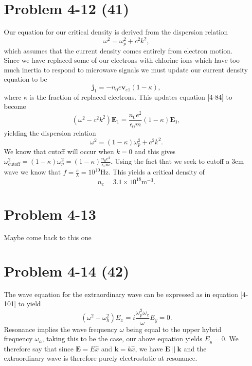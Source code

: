 \section*{Problem 4-12 (41)}
\label{sec:4-12}
Our equation for our critical density is derived from the dispersion relation
\begin{equation*}
	\omega^2 = \omega_p^2 + c^2k^2,
\end{equation*}
which assumes that the current density comes entirely from electron motion. Since we have replaced some of our electrons with chlorine ions which have too much inertia to respond to microwave signals we must update our current density equation to be
\begin{equation*}
	\bm{j}_1 = -n_0e\bm{v}_{e1}(1-\kappa),
\end{equation*}
where \(\kappa \) is the fraction of replaced electrons. This updates equation [4-84] to become 
\begin{equation*}
	\left(\omega^2 - c^2k^2 \right)\bm{E}_1 = \dfrac{n_0e^2}{\epsilon_0m}\left(1-\kappa\right)\bm{E}_1,
\end{equation*}
yielding the dispersion relation
\begin{equation*}
	\omega^2 = (1-\kappa)\omega^2_p + c^2k^2.
\end{equation*}
We know that cutoff will occur when \(k=0\) and this gives \(\omega^2_\text{cutoff} = (1-\kappa)\omega^2_p = (1-\kappa)\frac{n_0e^2}{\epsilon_0m} \). Using the fact that we seek to cutoff a \(3\)cm wave we know that \(f = \frac{c}{\lambda} = 10^{10} \)Hz. This yields a critical density of
\begin{equation*}
	n_c = 3.1\times 10^{18}\text{m}^{-3}. %
\end{equation*}

\section*{Problem 4-13 }
\label{sec:4-13}
Maybe come back to this one

\section*{Problem 4-14 (42)}
\label{sec:4-14}
The wave equation for the extraordinary wave can be expressed as in equation [4-101] to yield
\begin{equation*}
	(\omega^2 - \omega^2_h)E_x = i\dfrac{\omega^2_p\omega_c}{\omega}E_y = 0.
\end{equation*}
Resonance implies the wave frequency \(\omega \) being equal to the upper hybrid frequency \(\omega_h \), taking this to be the case, our above equation yields \(E_y = 0 \). We therefore say that since \(\bm{E} = E\hat{x}\) and \(\bm{k} = k\hat{x} \), we have \(\bm{E}\parallel\bm{k} \) and the extraordinary wave is therefore purely electrostatic at resonance.


